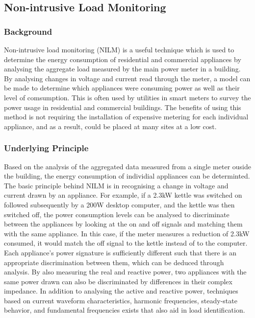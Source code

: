 \documentclass[11pt,twocolumn]{article}
\begin{document}
		\subsection{Non-intrusive Load Monitoring}

			\subsubsection*{Background}
			 \quad Non-intrusive load monitoring (NILM) is a useful technique which is used to determine the energy consumption of residential and commercial appliances by analysing the aggregate load measured by the main power meter in a building. By analysing changes in voltage and current read through the meter, a model can be made to determine which appliances were consuming power as well as their level of comsumption. This is often used by utilities in smart meters to survey the power usage in residential and commercial buildings. The benefits of using this method is not requiring the installation of expensive metering for each individual appliance, and as a result, could be placed at many sites at a low cost. 

			\subsubsection*{Underlying Principle}
			\quad Based on the analysis of the aggregated data measured from a single meter ouside the building, the energy consumption of individial appliances can be determinted. The basic principle behind NILM is in recognising a change in voltage and current drawn by an appliance. For example, if a 2.3kW kettle was switched on followed subsequently by a 200W desktop computer, and the kettle was then switched off, the power consumption levels can be analysed to discriminate between the appliances by looking at the on and off signals and matching them with the same appliance. In this case, if the meter measures a reduction of 2.3kW consumed, it would match the off signal to the kettle instead of to the computer. Each appliance's power signature is sufficiently different such that there is an appropriate discrimination between them, which can be deduced through analysis. By also measuring the real and reactive power, two appliances with the same power drawn can also be discriminated by differences in their complex impedance. In addition to analysing the active and reactive power, techniques based on current waveform characteristics, harmonic frequencies, steady-state behavior, and fundamental frequencies exists that also aid in load identification. 
\end{document}
